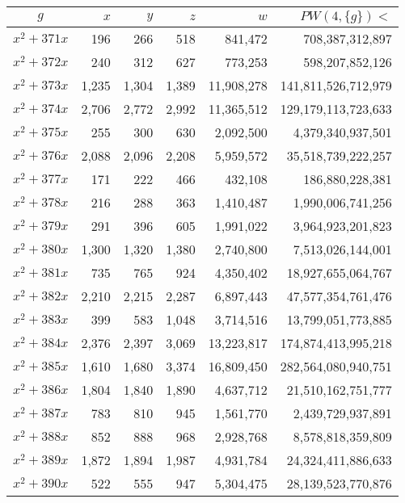 \documentclass{article}
\begin{document}
\begin{center}
\begin{tabular}{ | c | r | r | r | r | r | }
$g$ & $x$ & $y$ & $z$ & $w$ & $PW(4, \{g\}) <$ \\ \hline
$x^2 + 371x$ & 196 & 266 & 518 & 841{,}472 & 708{,}387{,}312{,}897 \\ \hline
$x^2 + 372x$ & 240 & 312 & 627 & 773{,}253 & 598{,}207{,}852{,}126 \\ \hline
$x^2 + 373x$ & 1{,}235 & 1{,}304 & 1{,}389 & 11{,}908{,}278 & 141{,}811{,}526{,}712{,}979 \\ \hline
$x^2 + 374x$ & 2{,}706 & 2{,}772 & 2{,}992 & 11{,}365{,}512 & 129{,}179{,}113{,}723{,}633 \\ \hline
$x^2 + 375x$ & 255 & 300 & 630 & 2{,}092{,}500 & 4{,}379{,}340{,}937{,}501 \\ \hline
$x^2 + 376x$ & 2{,}088 & 2{,}096 & 2{,}208 & 5{,}959{,}572 & 35{,}518{,}739{,}222{,}257 \\ \hline
$x^2 + 377x$ & 171 & 222 & 466 & 432{,}108 & 186{,}880{,}228{,}381 \\ \hline
$x^2 + 378x$ & 216 & 288 & 363 & 1{,}410{,}487 & 1{,}990{,}006{,}741{,}256 \\ \hline
$x^2 + 379x$ & 291 & 396 & 605 & 1{,}991{,}022 & 3{,}964{,}923{,}201{,}823 \\ \hline
$x^2 + 380x$ & 1{,}300 & 1{,}320 & 1{,}380 & 2{,}740{,}800 & 7{,}513{,}026{,}144{,}001 \\ \hline
$x^2 + 381x$ & 735 & 765 & 924 & 4{,}350{,}402 & 18{,}927{,}655{,}064{,}767 \\ \hline
$x^2 + 382x$ & 2{,}210 & 2{,}215 & 2{,}287 & 6{,}897{,}443 & 47{,}577{,}354{,}761{,}476 \\ \hline
$x^2 + 383x$ & 399 & 583 & 1{,}048 & 3{,}714{,}516 & 13{,}799{,}051{,}773{,}885 \\ \hline
$x^2 + 384x$ & 2{,}376 & 2{,}397 & 3{,}069 & 13{,}223{,}817 & 174{,}874{,}413{,}995{,}218 \\ \hline
$x^2 + 385x$ & 1{,}610 & 1{,}680 & 3{,}374 & 16{,}809{,}450 & 282{,}564{,}080{,}940{,}751 \\ \hline
$x^2 + 386x$ & 1{,}804 & 1{,}840 & 1{,}890 & 4{,}637{,}712 & 21{,}510{,}162{,}751{,}777 \\ \hline
$x^2 + 387x$ & 783 & 810 & 945 & 1{,}561{,}770 & 2{,}439{,}729{,}937{,}891 \\ \hline
$x^2 + 388x$ & 852 & 888 & 968 & 2{,}928{,}768 & 8{,}578{,}818{,}359{,}809 \\ \hline
$x^2 + 389x$ & 1{,}872 & 1{,}894 & 1{,}987 & 4{,}931{,}784 & 24{,}324{,}411{,}886{,}633 \\ \hline
$x^2 + 390x$ & 522 & 555 & 947 & 5{,}304{,}475 & 28{,}139{,}523{,}770{,}876 \\ \hline

\end{tabular}
\end{center}
\end{document}
